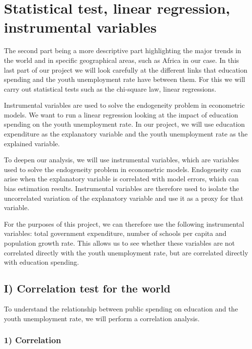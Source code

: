 \documentclass[
  letterpaper,
  DIV=11,
  numbers=noendperiod]{scrartcl}
\begin{document}
\hypertarget{statistical-test-linear-regression-instrumental-variables}{%
\section{Statistical test, linear regression, instrumental
variables}\label{statistical-test-linear-regression-instrumental-variables}}

The second part being a more descriptive part highlighting the major
trends in the world and in specific geographical areas, such as Africa
in our case. In this last part of our project we will look carefully at
the different links that education spending and the youth unemployment
rate have between them. For this we will carry out statistical tests
such as the chi-square law, linear regressions.

Instrumental variables are used to solve the endogeneity problem in
econometric models. We want to run a linear regression looking at the
impact of education spending on the youth unemployment rate. In our
project, we will use education expenditure as the explanatory variable
and the youth unemployment rate as the explained variable.

To deepen our analysis, we will use instrumental variables, which are
variables used to solve the endogeneity problem in econometric models.
Endogeneity can arise when the explanatory variable is correlated with
model errors, which can bias estimation results. Instrumental variables
are therefore used to isolate the uncorrelated variation of the
explanatory variable and use it as a proxy for that variable.

For the purposes of this project, we can therefore use the following
instrumental variables: total government expenditure, number of schools
per capita and population growth rate. This allows us to see whether
these variables are not correlated directly with the youth unemployment
rate, but are correlated directly with education spending.

\hypertarget{i-correlation-test-for-the-world}{%
\subsection{I) Correlation test for the
world}\label{i-correlation-test-for-the-world}}

To understand the relationship between public spending on education and
the youth unemployment rate, we will perform a correlation analysis.

\hypertarget{correlation}{%
\subsubsection{1) Correlation}\label{correlation}}
\end{document}
